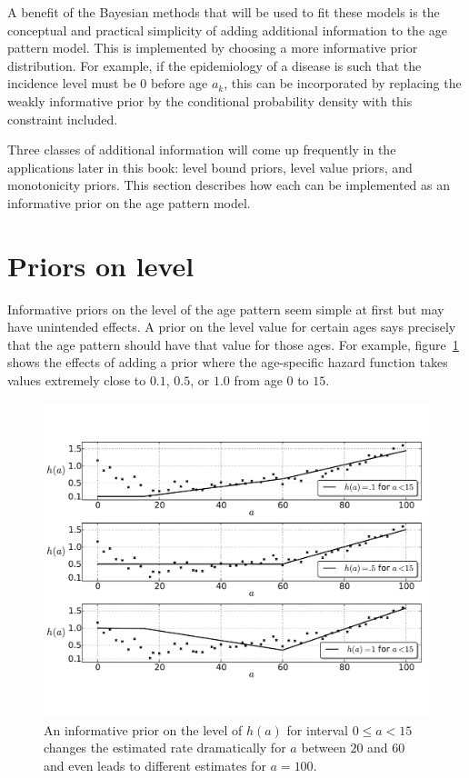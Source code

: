 A benefit of the Bayesian methods that will be used to fit these
models is the conceptual and practical simplicity of adding additional
information to the age pattern model.  This is implemented by choosing
a more informative prior distribution.  For example, if the
epidemiology of a disease is such that the incidence level must be
$0$ before age $a_k$, this can be incorporated by replacing the
weakly informative prior by the conditional probability density with
this constraint included.

Three classes of additional information will come up
frequently in the applications later in this book: level bound priors,
level value priors, and monotonicity priors. This section describes
how each can be implemented as an informative prior on the age pattern
model.


\section{Priors on level}

Informative priors on the level of the age pattern seem simple at
first but may have unintended effects.  A prior on the level value for
certain ages says precisely that the age pattern should have that
value for those ages.  For example, figure~\ref{level-value-priors}
shows the effects of adding a prior where the age-specific hazard function takes values extremely
close to $0.1$, $0.5$, or $1.0$ from age $0$ to $15$.

\begin{figure}[h]
\begin{center}
\includegraphics[width=\textwidth]{level_value-smoothing-splines.pdf}
\caption[An informative prior on the level of $h(a)$.]{An informative
  prior on the level of $h(a)$ for interval $0 \leq a <
  15$ changes the estimated rate dramatically for $a$ between $20$ and
  $60$ and even leads to different estimates for $a = 100$.}
\label{level-value-priors}
\end{center}
\end{figure}




